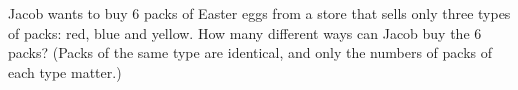 Jacob wants to buy $6$ packs of Easter eggs from a store that sells only three types of packs: red, blue and yellow. How many different ways can Jacob buy the $6$ packs? (Packs of the same type are identical, and only the numbers of packs of each type matter.)
